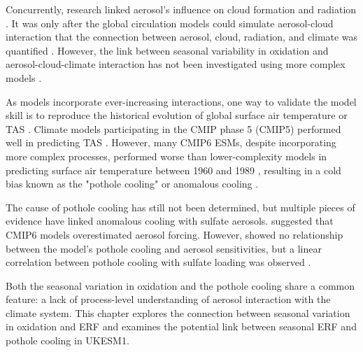 Concurrently, research linked aerosol's influence on cloud formation and radiation \citep{angstromAtmosphericTransmissionSun1929,twomeyInfluencePollutionShortwave1977,albrechtAerosolsCloudMicrophysics1989}. It was only after the global circulation models could simulate aerosol-cloud interaction that the connection between aerosol, cloud, radiation, and climate was quantified \citep{charlsonPerturbationNorthernHemisphere1991, charlsonClimateForcingAnthropogenic1992,tsaiSulfurCycleSulfate2010}. However, the link between seasonal variability in oxidation and aerosol-cloud-climate interaction has not been investigated using more complex models \citep[e.g. ][]{charlsonPerturbationNorthernHemisphere1991,barrieComparisonLargescaleAtmospheric2001,isaksenAtmosphericCompositionChange2009,mulcahyDescriptionEvaluationAerosol2020,oconnorAssessmentPreindustrialPresentday2021}. 


As models incorporate ever-increasing interactions, one way to validate the model skill is to reproduce the historical evolution of global surface air temperature or TAS \citep{fanGlobalSurfaceAir2020}. Climate models participating in the CMIP phase 5 (CMIP5) performed well in predicting TAS \citep{flynnClimateSensitivityHistorical2020}. However, many CMIP6 ESMs, despite incorporating more complex processes, performed worse than lower-complexity models in predicting surface air temperature between 1960 and 1989 \citep{fanGlobalSurfaceAir2020}, resulting in a cold bias known as the "pothole cooling" or anomalous cooling \citep{zhangRoleAnthropogenicAerosols2021}. 

The cause of pothole cooling has still not been determined, but multiple pieces of evidence have linked anomalous cooling with sulfate aerosols. \citet{flynnClimateSensitivityHistorical2020} suggested that CMIP6 models overestimated aerosol forcing. However, \citet{zhangRoleAnthropogenicAerosols2021} showed no relationship between the model's pothole cooling and aerosol sensitivities, but a linear correlation between pothole cooling with sulfate loading was observed \citep{zhangRoleAnthropogenicAerosols2021}. 

Both the seasonal variation in oxidation and the pothole cooling share a common feature: a lack of process-level understanding of aerosol interaction with the climate system. This chapter explores the connection between seasonal variation in oxidation and ERF and examines the potential link between seasonal ERF and pothole cooling in UKESM1.


